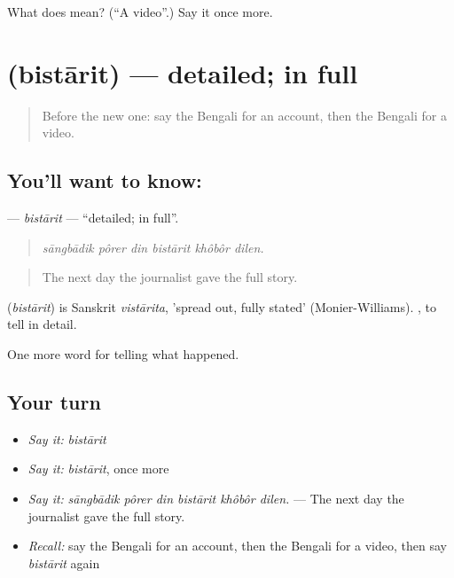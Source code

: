 \begin{tcolorbox}[breakable,colback=teal!4,colframe=teal!35!black,title={Before you move on}]
What does  mean? (\textquotedblleft{}A video\textquotedblright{}.) Say it once more.
\end{tcolorbox}
\section[\texorpdfstring{\bn{বিস্তারিত} (bistārit)}{বিস্তারিত (bistārit)}]{ (bistārit) — detailed; in full}

\label{lesson:BN-C301-bistarit}



\begin{quote}
Before the new one: say the Bengali for an account, then the Bengali for a video.
\end{quote}

\subsection*{You'll want to know: }
\textbf{} — \emph{bistārit} — \textquotedblleft{}detailed; in full\textquotedblright{}.

\begin{quote}
     
\end{quote}

\begin{quote}
\emph{sāngbādik pôrer din bistārit khôbôr dilen.}
\end{quote}

\begin{quote}
The next day the journalist gave the full story.
\end{quote}

\begin{cousinweb}
\textbf{} (\emph{bistārit}) is Sanskrit \emph{vistārita}, 'spread out, fully stated' (Monier-Williams).  , to tell in detail.
\end{cousinweb}

\begin{grammarlens}[title={What you've built}]
One more word for telling what happened.
\end{grammarlens}

\subsection*{Your turn}
\begin{itemize}
\raggedright
  \item \emph{Say it:} \emph{bistārit}
  \item \emph{Say it:} \emph{bistārit}, once more
  \item \emph{Say it:} \emph{sāngbādik pôrer din bistārit khôbôr dilen.} — The next day the journalist gave the full story.
  \item \emph{Recall:} say the Bengali for an account, then the Bengali for a video, then say \emph{bistārit} again
\end{itemize}

